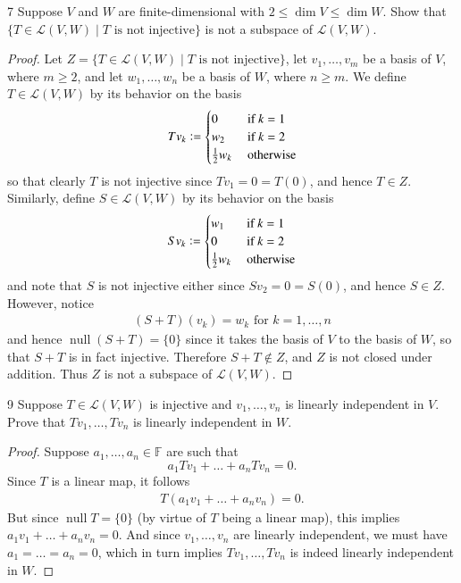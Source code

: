 \documentclass[11pt]{extarticle}
\newenvironment{problem}[1]{\begin{prob*}{#1}{}}{\end{prob*}}
\newcommand{\F}{\mathbb{F}}
\newcommand{\Hom}{\mathcal{L}}
\DeclareMathOperator{\Null}{null}
\newcommand{\defeq}{\vcentcolon=}
\begin{document}
\begin{problem}{7}
Suppose $V$ and $W$ are finite-dimensional with $2\leq \dim V\leq \dim W$.  Show that $\{T\in \Hom(V,W)\mid T \text{ is not injective}\}$ is not a subspace of $\Hom(V,W)$.
\end{problem}
\begin{proof}
Let $Z = \{T\in \Hom(V,W)\mid T \text{ is not injective}\}$, let $v_1,\dots, v_m$ be a basis of $V$, where $m\geq 2$, and let $w_1,\dots, w_n$ be a basis of $W$, where $n\geq m$.  We define $T\in \Hom(V,W)$ by its behavior on the basis
\begin{equation*}
Tv_k \defeq \begin{cases}0 &\text{ if }k = 1\\ w_2 &\text{ if }k = 2 \\ \frac{1}{2}w_{k} &\text{ otherwise}\end{cases}
\end{equation*}
so that clearly $T$ is not injective since $Tv_1 = 0 = T(0)$, and hence $T\in Z$.  Similarly, define $S\in\Hom(V,W)$ by its behavior on the basis
\begin{equation*}
Sv_k \defeq \begin{cases}w_1 &\text{ if }k = 1\\0 &\text{ if }k = 2\\ \frac{1}{2}w_{k} &\text{ otherwise}\end{cases}
\end{equation*}
and note that $S$ is not injective either since $Sv_2 = 0 = S(0)$, and hence $S\in Z$.  However, notice
\begin{align*}
(S+ T)(v_k) = w_k \text{ for } k = 1,\dots, n
\end{align*}
and hence $\Null(S+T)=\{0\}$ since it takes the basis of $V$ to the basis of $W$, so that $S+T$ is in fact injective.  Therefore $S+T\not\in Z$, and $Z$ is not closed under addition.  Thus $Z$ is not a subspace of $\Hom(V,W)$.
\end{proof}

\begin{problem}{9}
Suppose $T\in\Hom(V,W)$ is injective and $v_1,\dots, v_n$ is linearly independent in $V$.  Prove that $Tv_1,\dots, Tv_n$ is linearly independent in $W$.  
\end{problem}
\begin{proof}
Suppose $a_1,\dots, a_n\in\F$ are such that 
\begin{equation*}
a_1Tv_1 + \dots + a_nTv_n = 0.
\end{equation*}
Since $T$ is a linear map, it follows
\begin{align*}
T(a_1v_1 + \dots + a_nv_n) = 0.
\end{align*}
But since $\Null T = \{0\}$ (by virtue of $T$ being a linear map), this implies $a_1v_1 + \dots + a_nv_n= 0$.  And since $v_1,\dots, v_n$ are linearly independent, we must have $a_1=\dots = a_n = 0$, which in turn implies $Tv_1,\dots, Tv_n$ is indeed linearly independent in $W$.  
\end{proof}
\end{document}

